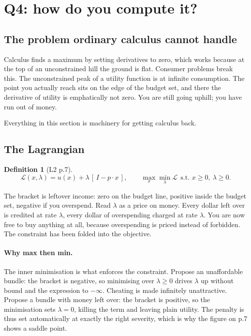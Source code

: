 \documentclass[11pt]{article}
\theoremstyle{definition}
\newtheorem{definition}{Definition}
\begin{document}
\clearpage

\section{Q4: how do you compute it?}

\subsection{The problem ordinary calculus cannot handle}

Calculus finds a maximum by setting derivatives to zero, which works because at the top of
an unconstrained hill the ground is flat. Consumer problems break this. The unconstrained
peak of a utility function is at infinite consumption. The point you actually reach sits on
the edge of the budget set, and there the derivative of utility is emphatically not zero.
You are still going uphill; you have run out of money.

Everything in this section is machinery for getting calculus back.

\subsection{The Lagrangian}

\begin{definition}[L2 p.7]
\[
\mathcal{L}(x,\lambda)=u(x)+\lambda\,[\,I-p\cdot x\,],
\qquad
\max_x\min_\lambda \mathcal{L}\ \ \text{s.t. } x\ge0,\ \lambda\ge0.
\]
\end{definition}

The bracket is leftover income: zero on the budget line, positive inside the budget set,
negative if you overspend. Read $\lambda$ as a price on money. Every dollar left over is
credited at rate $\lambda$, every dollar of overspending charged at rate $\lambda$. You are
now free to buy anything at all, because overspending is priced instead of forbidden. The
constraint has been folded into the objective.

\paragraph{Why max then min.} The inner minimisation is what enforces the constraint.
Propose an unaffordable bundle: the bracket is negative, so minimising over $\lambda\ge0$
drives $\lambda$ up without bound and the expression to $-\infty$. Cheating is made
infinitely unattractive. Propose a bundle with money left over: the bracket is positive, so
the minimisation sets $\lambda=0$, killing the term and leaving plain utility. The penalty
is thus set automatically at exactly the right severity, which is why the figure on p.7
shows a saddle point.
\end{document}
